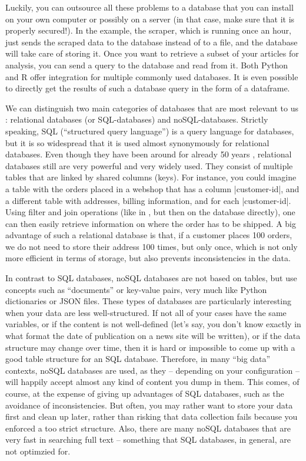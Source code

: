 Luckily, you can outsource all these problems to a database that you can
install on your own computer or possibly on a server (in that case, make
sure that it is properly secured!). In the example, the scraper, which
is running once an hour, just sends the scraped data to the database
instead of to a file, and the database will take care of storing it.
Once you want to retrieve a subset of your articles for analysis,
you can send a query to the database and read from it. Both Python and
R offer integration for multiple commonly used databases. It is even
possible to directly get the results of such a database query in the
form of a dataframe.

We can distinguish two main categories of databases
that are most relevant to us \citep[see also][]{Gunther2018}:
relational databases (or SQL-databases) and noSQL-databases. Strictly
speaking, SQL (``structured query language'') is a query language for
databases, but it is so widespread that it is used almost synonymously
for relational databases. Even though they have been around for
already 50 years \citep{Codd1970}, relational databases still are very
powerful and very widely used.  They consist of multiple tables that
are linked by shared columns (keys). For instance, you could imagine a
table with the orders placed in a webshop that has a column
|customer-id|, and a different table with addresses, billing
information, and for each |customer-id|. Using filter and join
operations (like in , but then on the database directly), one can then easily retrieve
information on where the order has to be shipped. A big advantage of
such a relational database is that, if a customer places 100 orders,
we do not need to store their address 100 times, but only once, which
is not only more efficient in terms of storage, but also prevents
inconsistencies in the data.

In contrast to SQL databases, noSQL databases are not based on tables,
but use concepts such as ``documents'' or key-value pairs, very much
like Python dictionaries or JSON files. These types of databases are
particularly interesting when your data are less well-structured. If
not all of your cases have the same variables, or if the content is not
well-defined (let's say, you don't know exactly in what format the date
of publication on a news site will be written), or if the data structure
may change over time, then it is hard or impossible to come up with a
good table structure for an SQL database. Therefore, in many ``big data''
contexts, noSQL databases are used, as they -- depending on your
configuration -- will happily accept almost any kind of content you dump
in them. This comes, of course, at the expense of giving up advantages
of SQL databases, such as the avoidance of inconsistencies. But often,
you may rather want to store your data first and clean up later, rather
than risking that data collection fails because you enforced a too strict
structure. Also, there are many noSQL databases that are very fast in
searching full text -- something that SQL databases, in general, are
not optimzied for.

